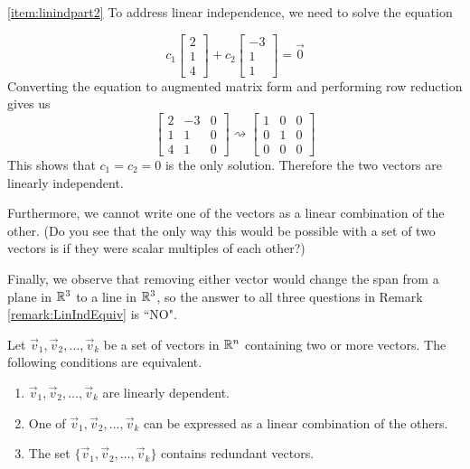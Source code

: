 \documentclass{ximera}
\begin{document}
\begin{example}
\begin{explanation}
 
 \ref{item:linindpart2} To address linear independence, we need to solve the equation
 
 $$c_1\begin{bmatrix}2\\1\\4\end{bmatrix}+c_2\begin{bmatrix}-3\\1\\1\end{bmatrix}=\vec{0}$$
 Converting the equation to augmented matrix form and performing row reduction gives us
 $$\left[\begin{array}{cc|c}  
 2&-3&0\\1&1&0\\4&1&0
 \end{array}\right]\rightsquigarrow\left[\begin{array}{cc|c}  
 1&0&0\\0&1&0\\0&0&0
 \end{array}\right]$$
 This shows that $c_1=c_2=0$ is the only solution.  Therefore the two vectors are linearly independent.
 
 Furthermore, we cannot write one of the vectors as a linear combination of the other.  (Do you see that the only way this would be possible with a set of two vectors is if they were scalar multiples of each other?)
 
Finally, we observe that removing either vector would change the span from a plane in $\mathbb{R}^3$ to a line in $\mathbb{R}^3$, so the answer to all three questions in Remark \ref{remark:LinIndEquiv} is ``NO".
\end{explanation}
\end{example}

\begin{theorem}\label{th:lindeplincombofother}
Let $\vec{v}_1,\vec{v}_2,\dots ,\vec{v}_k$ be  a set of vectors in $\mathbb{R}^n$ containing two or more vectors.  The following conditions are equivalent.
\begin{enumerate}
\item\label{th:lindeplincombofother_a} 
$\vec{v}_1,\vec{v}_2,\dots ,\vec{v}_k$ are linearly dependent.
\item\label{th:lindeplincombofother_b} 
One of $\vec{v}_1,\vec{v}_2,\dots ,\vec{v}_k$ can be expressed as a linear combination of the others.
\item\label{th:lindeplincombofother_c} 
The set $\{\vec{v}_1,\vec{v}_2,\dots ,\vec{v}_k\}$ contains redundant vectors.
\end{enumerate}
\end{theorem}
\end{document}
